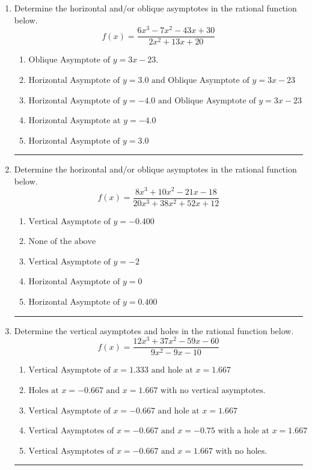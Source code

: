 \documentclass[14pt]{extbook}
\newcommand{\litem}[1]{\item#1\hspace*{-1cm}\rule{\textwidth}{0.4pt}}
\begin{document}
\begin{enumerate}
{\begin{enumerate}[label=\Alph*.]
\end{enumerate} }
\litem{
Determine the horizontal and/or oblique asymptotes in the rational function below.\[ f(x) = \frac{6x^{3} -7 x^{2} -43 x + 30}{2x^{2} +13 x + 20} \]\begin{enumerate}[label=\Alph*.]
\item \( \text{Oblique Asymptote of } y = 3x -23. \)
\item \( \text{Horizontal Asymptote of } y = 3.0 \text{ and Oblique Asymptote of } y = 3x -23 \)
\item \( \text{Horizontal Asymptote of } y = -4.0 \text{ and Oblique Asymptote of } y = 3x -23 \)
\item \( \text{Horizontal Asymptote at } y = -4.0 \)
\item \( \text{Horizontal Asymptote of } y = 3.0  \)

\end{enumerate} }
\litem{
Determine the horizontal and/or oblique asymptotes in the rational function below.\[ f(x) = \frac{8x^{3} +10 x^{2} -21 x -18}{20x^{3} +38 x^{2} +52 x + 12} \]\begin{enumerate}[label=\Alph*.]
\item \( \text{Vertical Asymptote of } y = -0.400  \)
\item \( \text{None of the above} \)
\item \( \text{Vertical Asymptote of } y = -2  \)
\item \( \text{Horizontal Asymptote of } y = 0  \)
\item \( \text{Horizontal Asymptote of } y = 0.400  \)

\end{enumerate} }
\litem{
Determine the vertical asymptotes and holes in the rational function below.\[ f(x) = \frac{12x^{3} +37 x^{2} -59 x -60}{9x^{2} -9 x -10} \]\begin{enumerate}[label=\Alph*.]
\item \( \text{Vertical Asymptote of } x = 1.333 \text{ and hole at } x = 1.667 \)
\item \( \text{Holes at } x = -0.667 \text{ and } x = 1.667 \text{ with no vertical asymptotes.} \)
\item \( \text{Vertical Asymptote of } x = -0.667 \text{ and hole at } x = 1.667 \)
\item \( \text{Vertical Asymptotes of } x = -0.667 \text{ and } x = -0.75 \text{ with a hole at } x = 1.667 \)
\item \( \text{Vertical Asymptotes of } x = -0.667 \text{ and } x = 1.667 \text{ with no holes.} \)


\end{enumerate}}
\end{enumerate}
\end{document}
